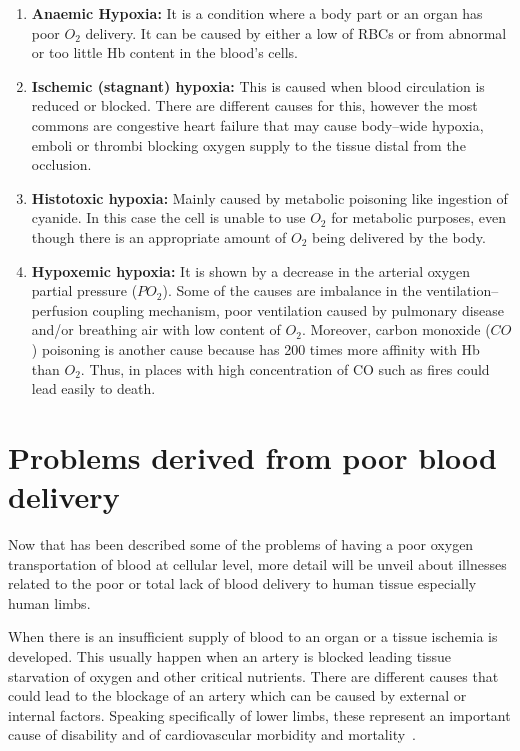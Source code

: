 \begin{enumerate}
	\item \textbf{Anaemic Hypoxia:} It is a condition where a body part or an organ has poor $O_2$ delivery. It can be caused by either a low of RBCs or from abnormal or too little Hb content in the blood's cells.
	\item \textbf{Ischemic (stagnant) hypoxia: }This is caused when blood circulation is reduced or blocked. There are different causes for this, however the most commons are congestive heart failure that may cause body–wide hypoxia, emboli or thrombi blocking oxygen supply to the tissue distal from the occlusion. 
	\item \textbf{Histotoxic hypoxia: }Mainly caused by metabolic poisoning like ingestion of cyanide. In this case the cell is unable to use $O_2$ for metabolic purposes, even though there is an appropriate amount of $O_2$ being delivered by the body.
	\item \textbf{Hypoxemic hypoxia:} It is shown by a decrease in the arterial oxygen partial pressure ($PO_2$). Some of the causes are imbalance in the ventilation–perfusion coupling mechanism, poor ventilation caused by pulmonary disease and/or breathing air with low content of $O_2$. Moreover, carbon monoxide ($CO$) poisoning is another cause because has \num{200} times more affinity with Hb than $O_2$. Thus, in places with high concentration of CO such as fires could lead easily to death.
\end{enumerate}

\section{Problems derived from poor blood delivery} %
\label{section2.2}
Now that has been described some of the problems of having a poor oxygen transportation of blood at cellular level, more detail will be unveil about illnesses related to the poor or total lack of blood delivery to human tissue especially human limbs. 

When there is an insufficient supply of blood to an organ or a tissue ischemia is developed. This usually happen when an artery is blocked leading tissue starvation of oxygen and other critical nutrients. There are different causes that could lead to the blockage of an artery which can be caused by external or internal factors. Speaking specifically of lower limbs, these represent an important cause of disability and of cardiovascular morbidity and mortality~\cite{novo1995patients}. 

